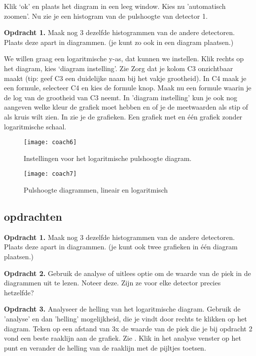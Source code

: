 Klik `ok' en plaats het diagram in een leeg window. Kies nu 'automatisch zoomen'.
Nu zie je een histogram van de pulshoogte van detector 1.

\textbf{Opdracht 1.}
Maak nog 3 dezelfde histogrammen van de andere detectoren. Plaats deze apart in diagrammen.
(je kunt zo ook in een diagram plaatsen.)

We willen graag een logaritmische y-as, dat kunnen we instellen.
Klik rechts op het diagram, kies `diagram instelling'. Zie 
Zorg dat je kolom C3 onzichtbaar maakt (tip: geef C3 een duidelijke naam bij het vakje
grootheid). In C4 maak je een formule, selecteer C4 en kies de formule knop. 
Maak nu een formule waarin je de log van de grootheid van C3 neemt. 
In 'diagram instelling' kun je ook nog aangeven welke kleur de grafiek moet hebben en
of je de meetwaarden als stip of als kruis wilt zien. In  zie je 
de grafieken. Een grafiek met en één grafiek zonder logaritmische schaal.


\begin{figure}
    \centering
    \texttt{[image: coach6]}
    \caption{Instellingen voor het logaritmische pulshoogte diagram.}
    \label{fig:coach6}
\end{figure}

\begin{figure}
    \centering
    \texttt{[image: coach7]}
    \caption{Pulshoogte diagrammen, lineair en logaritmisch}
    \label{fig:coach7}
\end{figure}
 
 
\subsection{opdrachten} 
\label{sec:opdrachten}

\textbf{Opdracht 1.}
Maak nog 3 dezelfde histogrammen van de andere detectoren. Plaats deze apart in diagrammen.
(je kunt ook twee grafieken in één diagram plaatsen.)

\textbf{Opdracht 2.}
Gebruik de analyse of uitlees optie om de waarde van de piek in de diagrammen
uit te lezen. Noteer deze. Zijn ze voor elke detector precies hetzelfde?

\textbf{Opdracht 3.}
Analyseer de helling van het logaritmische diagram. Gebruik de 'analyse' en dan 'helling'
mogelijkheid, die je vindt door rechts te klikken op het diagram. 
Teken op een afstand van 3x de waarde van de piek die je bij opdracht 2 vond een beste raaklijn aan de
grafiek. Zie . Klik in het analyse venster op het punt en verander
de helling van de raaklijn met de pijltjes toetsen.

